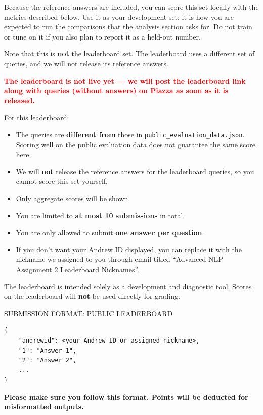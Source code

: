 \documentclass[11pt]{article}
\newcommand{\subsec}[1]{%
  \vspace{0.8em}
  \noindent{\sffamily\bfseries\color{mauve} #1}
  \vspace{0.35em}
  \par
}
\begin{document}
\noindent Because the reference answers are included, you can score this set locally with the metrics
described below. Use it as your development set: it is how you are expected to run the comparisons
that the analysis section asks for. Do not train or tune on it if you also plan to report it as a
held-out number.

\vspace{0.5em}
\noindent Note that this is \textbf{not} the leaderboard set. The leaderboard uses a different set of
queries, and we will not release its reference answers.

\subsec{Public leaderboard}

\noindent\textcolor{red}{\textbf{The leaderboard is not live yet --- we will post the leaderboard
link along with queries (without answers) on Piazza as soon as it is released.}}

\vspace{0.4em}
\noindent For this leaderboard:
\begin{itemize}[nosep, leftmargin=2em]
  \item The queries are \textbf{different from} those in \texttt{public\_evaluation\_data.json}.
    Scoring well on the public evaluation data does not guarantee the same score here.
  \item We will \textbf{not} release the reference answers for the leaderboard queries, so you cannot
    score this set yourself.
  \item Only aggregate scores will be shown.
  \item You are limited to \textbf{at most 10 submissions} in total.
  \item You are only allowed to submit \textbf{one answer per question}.
  \item If you don't want your Andrew ID displayed, you can replace it with the nickname we assigned
    to you through email titled ``Advanced NLP Assignment 2 Leaderboard Nicknames''.
\end{itemize}

\vspace{0.4em}
\noindent The leaderboard is intended solely as a development and diagnostic tool. Scores on the
leaderboard will \textbf{not} be used directly for grading.

\begin{deliverables}{SUBMISSION FORMAT: PUBLIC LEADERBOARD}
\begin{verbatim}
{
    "andrewid": <your Andrew ID or assigned nickname>,
    "1": "Answer 1",
    "2": "Answer 2",
    ...
}
\end{verbatim}
\textbf{Please make sure you follow this format. Points will be deducted for misformatted outputs.}
\end{deliverables}
\end{document}
